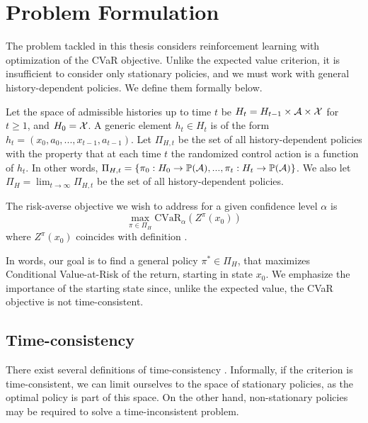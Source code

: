 \section{Problem Formulation}\label{sec:prelim:problem}

The problem tackled in this thesis considers reinforcement learning with optimization of the CVaR objective. Unlike the expected value criterion, it is insufficient to consider only stationary policies, and we must work with general history-dependent policies. We define them formally below.

\begin{definition}
Let the space of admissible histories up to time $t$ be $H_t = H_{t-1} \times \mathcal{A} \times \mathcal{X}$ for $t \ge 1$, and $H_0 = \mathcal{X}$. A generic element $h_t \in H_t$ is of the form $h_t = (x_0, a_0, ..., x_{t-1}, a_{t-1})$. Let $\Pi_{H,t}$ be the set of all history-dependent policies with the property that at each time $t$ the randomized control action is a function of $h_t$. In other words, 
$\Pi_{H,t} = \left\{ {\pi_0: H_0 \to \mathbb{P}(\mathcal{A}), ..., \pi_t: H_t \to \mathbb{P}(\mathcal{A})} \right\}$. We also let $\Pi_H = \lim_{t\to\infty}\Pi_{H,t}$ be the set of all history-dependent policies.
\end{definition}

The risk-averse objective we wish to address for a given confidence level $\alpha$ is
\begin{equation}\label{eqn:problem}
\max_{\pi \in \Pi_H} \text{CVaR}_\alpha(Z^\pi(x_0))
\end{equation}
where $Z^\pi(x_0)$ coincides with definition .

In words, our goal is to find a general policy $\pi^*\in \Pi_H$, that maximizes Conditional Value-at-Risk of the return, starting in state $x_0$. We emphasize the importance of the starting state since, unlike the expected value, the CVaR objective is not time-consistent.


\subsection{Time-consistency}\label{sec:time}

There exist several definitions of time-consistency \citep{pflug2016time, boda2006time}.
Informally, if the criterion is time-consistent, we can limit ourselves to the space of stationary policies, as the optimal policy is part of this space. On the other hand, non-stationary policies may be required to solve a time-inconsistent problem.

